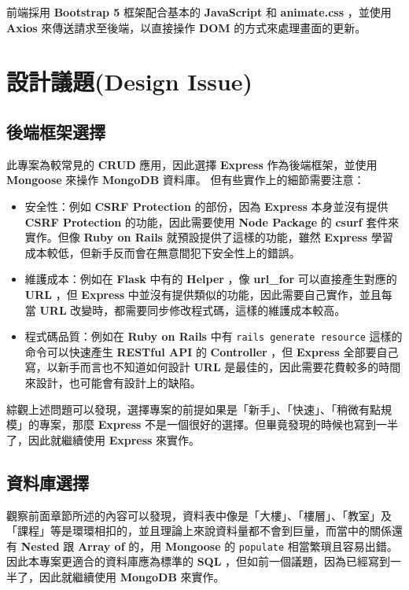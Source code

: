 \documentclass{article}
\begin{document}
前端採用 \textbf{Bootstrap 5} 框架配合基本的 \textbf{JavaScript} 和 \textbf{animate.css} ，並使用 \textbf{Axios} 來傳送請求至後端，以直接操作 \textbf{DOM} 的方式來處理畫面的更新。

\newpage

\section[設計議題(DESIGN ISSUE)]{設計議題(Design Issue)}

\subsection{後端框架選擇}

此專案為較常見的 \textbf{CRUD} 應用，因此選擇 \textbf{Express} 作為後端框架，並使用 \textbf{Mongoose} 來操作 \textbf{MongoDB} 資料庫。
但有些實作上的細節需要注意：

\begin{itemize}
	\item 安全性：例如 \textbf{CSRF Protection} 的部份，因為 \textbf{Express} 本身並沒有提供 \textbf{CSRF Protection} 的功能，因此需要使用 \textbf{Node Package} 的 \textbf{csurf} 套件來實作。但像 \textbf{Ruby on Rails} 就預設提供了這樣的功能，雖然 \textbf{Express} 學習成本較低，但新手反而會在無意間犯下安全性上的錯誤。
	\item 維護成本：例如在 \textbf{Flask} 中有的 \textbf{Helper} ，像 \textbf{url\_for} 可以直接產生對應的 \textbf{URL} ，但 \textbf{Express} 中並沒有提供類似的功能，因此需要自己實作，並且每當 \textbf{URL} 改變時，都需要同步修改程式碼，這樣的維護成本較高。
	\item 程式碼品質：例如在 \textbf{Ruby on Rails} 中有 \verb|rails generate resource| 這樣的命令可以快速產生 \textbf{RESTful API} 的 \textbf{Controller} ，但 \textbf{Express} 全部要自己寫，以新手而言也不知道如何設計 \textbf{URL} 是最佳的，因此需要花費較多的時間來設計，也可能會有設計上的缺陷。
\end{itemize}

綜觀上述問題可以發現，選擇專案的前提如果是「新手」、「快速」、「稍微有點規模」的專案，那麼 \textbf{Express} 不是一個很好的選擇。但畢竟發現的時候也寫到一半了，因此就繼續使用 \textbf{Express} 來實作。

\subsection{資料庫選擇}

觀察前面章節所述的內容可以發現，資料表中像是「大樓」、「樓層」、「教室」及「課程」等是環環相扣的，並且理論上來說資料量都不會到巨量，而當中的關係還有 \textbf{Nested} 跟 \textbf{Array of} 的，用 \textbf{Mongoose} 的 \verb|populate| 相當繁瑣且容易出錯。
因此本專案更適合的資料庫應為標準的 \textbf{SQL} ，但如前一個議題，因為已經寫到一半了，因此就繼續使用 \textbf{MongoDB} 來實作。
\end{document}
